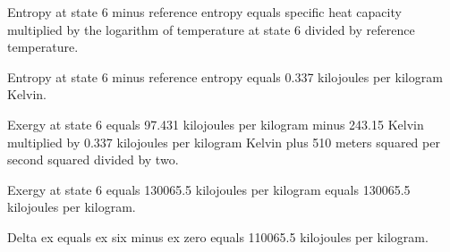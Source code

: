 Entropy at state 6 minus reference entropy equals specific heat capacity multiplied by the logarithm of temperature at state 6 divided by reference temperature.  

Entropy at state 6 minus reference entropy equals 0.337 kilojoules per kilogram Kelvin.  

Exergy at state 6 equals 97.431 kilojoules per kilogram minus 243.15 Kelvin multiplied by 0.337 kilojoules per kilogram Kelvin plus 510 meters squared per second squared divided by two.  

Exergy at state 6 equals 130065.5 kilojoules per kilogram equals 130065.5 kilojoules per kilogram.

Delta ex equals ex six minus ex zero equals 110065.5 kilojoules per kilogram.